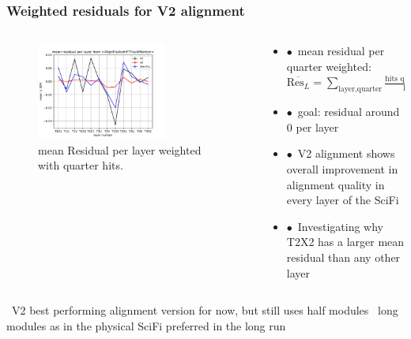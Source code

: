 \documentclass[aspectratio=1610, 12pt]{beamer}
\begin{document}
\begin{frame}\frametitle{Weighted residuals for V2 alignment}
    \begin{columns}
      \begin{column}[c]{0.48\textwidth}
        \begin{figure}
          \centering
          \includegraphics[width=0.7\textwidth]{2023-mar-9-DPG/meanResidual_AlignTracks_weighted.pdf}
          \caption{mean Residual per layer weighted with quarter hits.}
        \end{figure}
      \end{column}
      \begin{column}{0.48\textwidth}
        \begin{itemize}
          \item $\bullet$\, mean residual per quarter weighted: $
              \overline{\text{Res}_{L}} = \sum_{\text{layer}, \text{quarter}} \frac{\text{hits quarter of layer}}{\text{hits layer}}$
          \item $\bullet$\, goal: residual around 0 per layer
          \item $\bullet$\, V2 alignment shows overall improvement in alignment quality in every layer of the SciFi
          \item $\bullet$\, Investigating why T2X2 has a larger mean residual than any other layer
        \end{itemize}
      \end{column}
    \end{columns}
  \to\, V2 best performing alignment version for now, but still uses half modules
  \to\, long modules as in the physical SciFi preferred in the long run
\end{frame}
\end{document}
